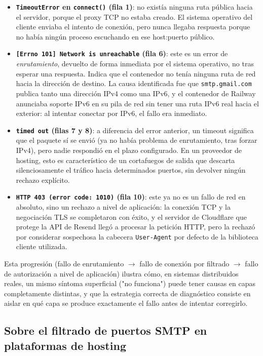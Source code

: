 \documentclass[12pt,a4paper]{article}
\begin{document}
\begin{itemize}
    \item \textbf{\texttt{TimeoutError} en \texttt{connect()} (fila 1)}: no existía ninguna ruta pública hacia el servidor, porque el proxy TCP no estaba creado. El sistema operativo del cliente enviaba el intento de conexión, pero nunca llegaba respuesta porque no había ningún proceso escuchando en ese host:puerto público.
    \item \textbf{\texttt{[Errno 101] Network is unreachable} (fila 6)}: este es un error de \textit{enrutamiento}, devuelto de forma inmediata por el sistema operativo, no tras esperar una respuesta. Indica que el contenedor no tenía ninguna ruta de red hacia la dirección de destino. La causa identificada fue que \texttt{smtp.gmail.com} publica tanto una dirección IPv4 como una IPv6, y el contenedor de Railway anunciaba soporte IPv6 en su pila de red sin tener una ruta IPv6 real hacia el exterior: al intentar conectar por IPv6, el fallo era inmediato.
    \item \textbf{\texttt{timed out} (filas 7 y 8)}: a diferencia del error anterior, un timeout significa que el paquete sí se envió (ya no había problema de enrutamiento, tras forzar IPv4), pero nadie respondió en el plazo configurado. En un proveedor de hosting, esto es característico de un cortafuegos de salida que descarta silenciosamente el tráfico hacia determinados puertos, sin devolver ningún rechazo explícito.
    \item \textbf{\texttt{HTTP 403 (error code: 1010)} (fila 10)}: este ya no es un fallo de red en absoluto, sino un rechazo a nivel de aplicación: la conexión TCP y la negociación TLS se completaron con éxito, y el servidor de Cloudflare que protege la API de Resend llegó a procesar la petición HTTP, pero la rechazó por considerar sospechosa la cabecera \texttt{User-Agent} por defecto de la biblioteca cliente utilizada.
\end{itemize}

Esta progresión (fallo de enrutamiento $\rightarrow$ fallo de conexión por filtrado $\rightarrow$ fallo de autorización a nivel de aplicación) ilustra cómo, en sistemas distribuidos reales, un mismo síntoma superficial ("no funciona") puede tener causas en capas completamente distintas, y que la estrategia correcta de diagnóstico consiste en aislar en qué capa se produce exactamente el fallo antes de intentar corregirlo.

\subsection{Sobre el filtrado de puertos SMTP en plataformas de hosting}
\end{document}

